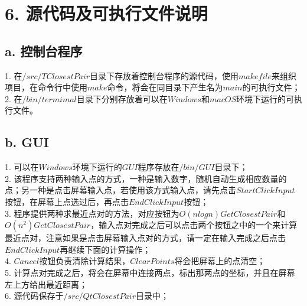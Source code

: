 \documentclass[12pt]{article}
\begin{document}
  \section*{6. 源代码及可执行文件说明}
  \subsection*{a. 控制台程序}
    1. 在$/src/TClosestPair$目录下存放着控制台程序的源代码，使用$makefile$来组织项目，在命令行中使用$make$命令，将会在同目录下产生名为$main$的可执行文件；\\
    2. 在$/bin/termimal$目录下分别存放着可以在$Windows$和$macOS$环境下运行的可执行文件。
  \subsection*{b. GUI}
  	1. 可以在$Windows$环境下运行的$GUI$程序存放在$/bin/GUI$目录下；\\
  	2. 该程序支持两种输入点的方式，一种是输入数字，随机自动生成相应数量的点；另一种是点击屏幕输入点，若使用该方式输入点，请先点击$Start Click Input$按钮，在屏幕上点选过后，再点击$End Click Input$按钮；\\
  	3. 程序提供两种求最近点对的方法，对应按钮为$O(nlogn) Get Closest Pair$和$O(n^2) Get Closest Pair$，输入点对完成之后可以点击两个按钮之中的一个来计算最近点对，注意如果是点击屏幕输入点对的方式，请一定在输入完成之后点击$End Click Input$再继续下面的计算操作；\\
  	4. $Cancel$按钮负责清除计算结果，$Clear Points$将会把屏幕上的点清空；\\
  	5. 计算点对完成之后，将会在屏幕中连接两点，标出那两点的坐标，并且在屏幕左上方给出最近距离；\\
    6. 源代码保存于$/src/QtClosestPair$目录中；
\end{document}
